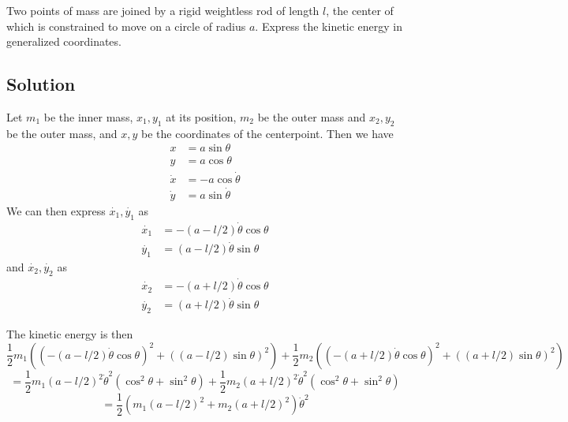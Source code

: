 Two points of mass are joined by a rigid weightless rod of length $l$,
the center of which is constrained to move on a circle of radius $a$.
Express the kinetic energy in generalized coordinates.

\subsection*{Solution}
Let $m_1$ be the inner mass, $x_1, y_1$ at its position, $m_2$ be the
outer mass and $x_2,y_2$ be the outer mass, and $x, y$ be the
coordinates of the centerpoint.  Then we have
\begin{align*}
  x &= a\sin\theta \\
  y &= a\cos\theta \\
  \dot{x} &= -a\cos\dot{\theta} \\
  \dot{y} &= a\sin\dot{\theta}
\end{align*}
We can then express $\dot{x_1},\dot{y_1}$ as
\begin{align*}
  \dot{x_1} &= -(a - l/2)\dot{\theta}\cos\theta \\
  \dot{y_1} &= (a - l/2)\dot{\theta}\sin\theta
\end{align*}
and $\dot{x_2},\dot{y_2}$ as
\begin{align*}
  \dot{x_2} &= -(a + l/2)\dot{\theta}\cos\theta \\
  \dot{y_2} &= (a + l/2)\dot{\theta}\sin\theta
\end{align*}

The kinetic energy is then
\[
\frac{1}{2}m_1((-(a - l/2)\dot{\theta}\cos\theta)^2 + ((a - l/2)\sin\theta)^2) +
\frac{1}{2}m_2((-(a + l/2)\dot{\theta}\cos\theta)^2 + ((a + l/2)\sin\theta)^2)
\]
\[
=\frac{1}{2}m_1(a - l/2)^2\dot{\theta}^2(\cos^2\theta + \sin^2\theta) +
\frac{1}{2}m_2(a + l/2)^2\dot{\theta}^2(\cos^2\theta + \sin^2\theta)
\]
\[
=\frac{1}{2}(m_1(a - l/2)^2 + m_2(a + l/2)^2)\dot{\theta}^2
\]
